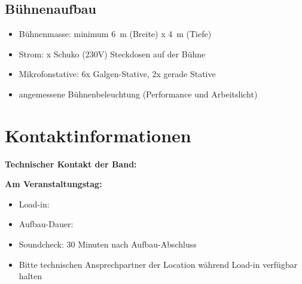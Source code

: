 \documentclass{techrider}  %
\begin{document}
\subsection{Bühnenaufbau}
\begin{itemize}
    \item Bühnenmasse: minimum 6 m (Breite) x 4 m (Tiefe)
    \item Strom:  x Schuko (230V) Steckdosen auf der Bühne
    \item Mikrofonstative: 6x Galgen-Stative, 2x gerade Stative
    \item angemessene Bühnenbeleuchtung (Performance und Arbeitslicht)
\end{itemize}


\section{Kontaktinformationen}

\textbf{Technischer Kontakt der Band:}\\
\printcontactinfo

\textbf{Am Veranstaltungstag:}
\begin{itemize}
    \item Load-in: \printloadintime
    \item Aufbau-Dauer: \printsetuptime
    \item Soundcheck: 30 Minuten nach Aufbau-Abschluss
    \item Bitte technischen Ansprechpartner der Location während Load-in verfügbar halten
\end{itemize}
\end{document}
